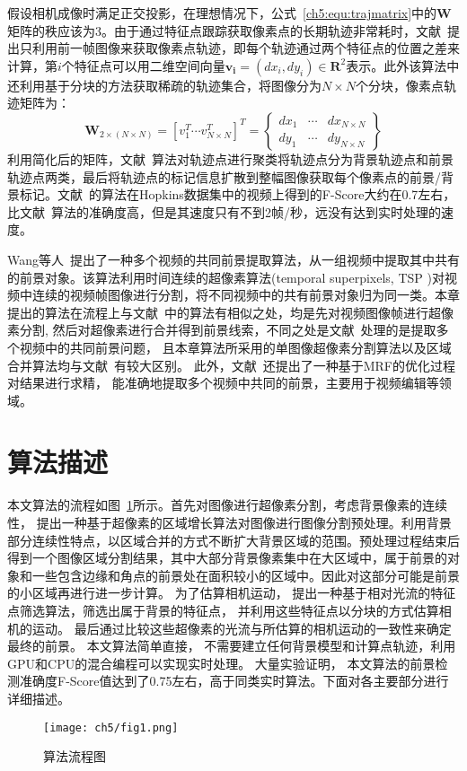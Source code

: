 假设相机成像时满足正交投影，在理想情况下，公式~\ref{ch5:equ:trajmatrix}中的$\mathbf{W}$矩阵的秩应该为3\cite{Tomasi_1992}。由于通过特征点跟踪获取像素点的长期轨迹非常耗时，文献~\cite{ACPRRealTime}提出只利用前一帧图像来获取像素点轨迹，即每个轨迹通过两个特征点的位置之差来计算，第$i$个特征点可以用二维空间向量$\mathbf{v_i}=(dx_i,dy_i) \in \mathbf{R}^2$表示。此外该算法中还利用基于分块的方法获取稀疏的轨迹集合，将图像分为$N \times N$个分块，像素点轨迹矩阵为：
$$ \mathbf{W}_{2 \times (N \times N )} = {[v_{1}^T \cdots v_{N \times N}^T]}^T = \begin{Bmatrix}
dx_1 & \cdots & dx_{N \times N} \\
dy_1 & \cdots & dy_{N \times N}
\end{Bmatrix}$$
利用简化后的矩阵，文献~\cite{ACPRRealTime}算法对轨迹点进行聚类将轨迹点分为背景轨迹点和前景轨迹点两类，最后将轨迹点的标记信息扩散到整幅图像获取每个像素点的前景/背景标记。文献~\cite{ACPRRealTime}的算法在Hopkins数据集中的视频上\cite{HopKinsDataSet}得到的F-Score大约在0.7左右，比文献~\cite{5.8s}算法的准确度高，但是其速度只有不到2帧/秒，远没有达到实时处理的速度。\par

Wang等人~\cite{WangTMM2014}提出了一种多个视频的共同前景提取算法，从一组视频中提取其中共有的前景对象。该算法利用时间连续的超像素算法(temporal superpixels, TSP )对视频中连续的视频帧图像进行分割，将不同视频中的共有前景对象归为同一类。本章提出的算法在流程上与文献~中的算法有相似之处，均是先对视频图像帧进行超像素分割, 然后对超像素进行合并得到前景线索，不同之处是文献~处理的是提取多个视频中的共同前景问题， 且本章算法所采用的单图像超像素分割算法以及区域合并算法均与文献~有较大区别。 此外，文献~还提出了一种基于MRF的优化过程对结果进行求精， 能准确地提取多个视频中共同的前景，主要用于视频编辑等领域。




\section{算法描述}
\label{ch5:sec:algorithm}
本文算法的流程如图~\ref{ch5:fig:flowchart}所示。首先对图像进行超像素分割，考虑背景像素的连续性， 提出一种基于超像素的区域增长算法对图像进行图像分割预处理。利用背景部分连续性特点，以区域合并的方式不断扩大背景区域的范围。预处理过程结束后得到一个图像区域分割结果，其中大部分背景像素集中在大区域中，属于前景的对象和一些包含边缘和角点的前景处在面积较小的区域中。因此对这部分可能是前景的小区域再进行进一步计算。 为了估算相机运动， 提出一种基于相对光流的特征点筛选算法，筛选出属于背景的特征点， 并利用这些特征点以分块的方式估算相机的运动。 最后通过比较这些超像素的光流与所估算的相机运动的一致性来确定最终的前景。 本文算法简单直接， 不需要建立任何背景模型和计算点轨迹，利用GPU和CPU的混合编程可以实现实时处理。 大量实验证明， 本文算法的前景检测准确度F-Score值达到了0.75左右，高于同类实时算法\cite{5.8s}。下面对各主要部分进行详细描述。
\begin{figure}
  \centering
  \texttt{[image: ch5/fig1.png]}\\
  \caption{算法流程图}\label{ch5:fig:flowchart}
\end{figure}

